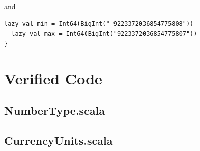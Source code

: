 \documentclass[runningheads]{llncs}
\begin{document}
and

\begin{lstlisting}[style=scala]
  lazy val min = Int64(BigInt("-9223372036854775808"))
  lazy val max = Int64(BigInt("9223372036854775807"))
}
\end{lstlisting}


\section{Verified Code}
\label{sec:verified}

\subsection{NumberType.scala}


\subsection{CurrencyUnits.scala}

\end{document}
